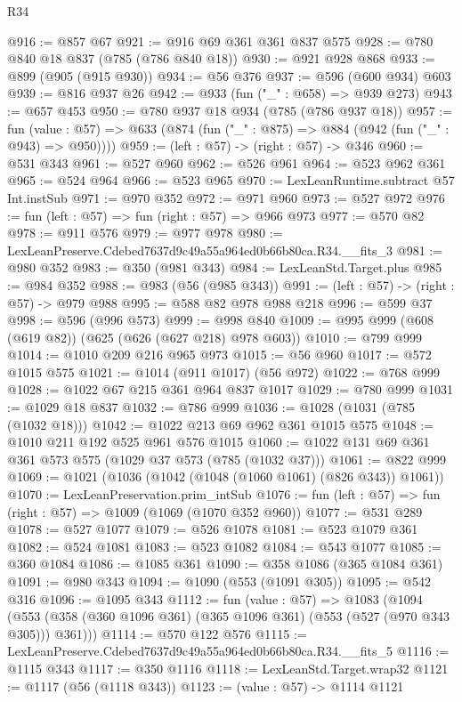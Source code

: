\begin{lexlean}{R34}
\begin{coremodule}
@916 := @857 @67
@921 := @916 @69 @361 @361 @837 @575
@928 := @780 @840 @18 @837 (@785 (@786 @840 @18))
@930 := @921 @928 @868
@933 := @899 (@905 (@915 @930))
@934 := @56 @376
@937 := @596 (@600 @934) @603
@939 := @816 @937 @26
@942 := @933 (fun ("_" : @658) => @939 @273)
@943 := @657 @453
@950 := @780 @937 @18 @934 (@785 (@786 @937 @18))
@957 := fun (value : @57) =>
  @633 (@874 (fun ("_" : @875) => @884 (@942 (fun ("_" : @943) => @950))))
@959 := (left : @57) -> (right : @57) -> @346
@960 := @531 @343
@961 := @527 @960
@962 := @526 @961
@964 := @523 @962 @361
@965 := @524 @964
@966 := @523 @965
@970 := LexLeanRuntime.subtract @57 Int.instSub
@971 := @970 @352
@972 := @971 @960
@973 := @527 @972
@976 := fun (left : @57) => fun (right : @57) => @966 @973
@977 := @570 @82
@978 := @911 @576
@979 := @977 @978
@980 := LexLeanPreserve.Cdebed7637d9c49a55a964ed0b66b80ca.R34.__fits_3
@981 := @980 @352
@983 := @350 (@981 @343)
@984 := LexLeanStd.Target.plus
@985 := @984 @352
@988 := @983 (@56 (@985 @343))
@991 := (left : @57) -> (right : @57) -> @979 @988
@995 := @588 @82 @978 @988 @218
@996 := @599 @37
@998 := @596 (@996 @573)
@999 := @998 @840
@1009 := @995 @999 (@608 (@619 @82)) (@625 (@626 (@627 @218) @978 @603))
@1010 := @799 @999
@1014 := @1010 @209 @216 @965 @973
@1015 := @56 @960
@1017 := @572 @1015 @575
@1021 := @1014 (@911 @1017) (@56 @972)
@1022 := @768 @999
@1028 := @1022 @67 @215 @361 @964 @837 @1017
@1029 := @780 @999
@1031 := @1029 @18 @837
@1032 := @786 @999
@1036 := @1028 (@1031 (@785 (@1032 @18)))
@1042 := @1022 @213 @69 @962 @361 @1015 @575
@1048 := @1010 @211 @192 @525 @961 @576 @1015
@1060 := @1022 @131 @69 @361 @361 @573 @575 (@1029 @37 @573 (@785 (@1032 @37)))
@1061 := @822 @999
@1069 := @1021 (@1036 (@1042 (@1048 (@1060 @1061) (@826 @343)) @1061))
@1070 := LexLeanPreservation.prim_intSub
@1076 := fun (left : @57) => fun (right : @57) => @1009 (@1069 (@1070 @352 @960))
@1077 := @531 @289
@1078 := @527 @1077
@1079 := @526 @1078
@1081 := @523 @1079 @361
@1082 := @524 @1081
@1083 := @523 @1082
@1084 := @543 @1077
@1085 := @360 @1084
@1086 := @1085 @361
@1090 := @358 @1086 (@365 @1084 @361)
@1091 := @980 @343
@1094 := @1090 (@553 (@1091 @305))
@1095 := @542 @316
@1096 := @1095 @343
@1112 := fun (value : @57) =>
  @1083
    (@1094 (@553 (@358 (@360 @1096 @361) (@365 @1096 @361) (@553 (@527 (@970 @343 @305))) @361)))
@1114 := @570 @122 @576
@1115 := LexLeanPreserve.Cdebed7637d9c49a55a964ed0b66b80ca.R34.__fits_5
@1116 := @1115 @343
@1117 := @350 @1116
@1118 := LexLeanStd.Target.wrap32
@1121 := @1117 (@56 (@1118 @343))
@1123 := (value : @57) -> @1114 @1121

\end{coremodule}
\end{lexlean}

